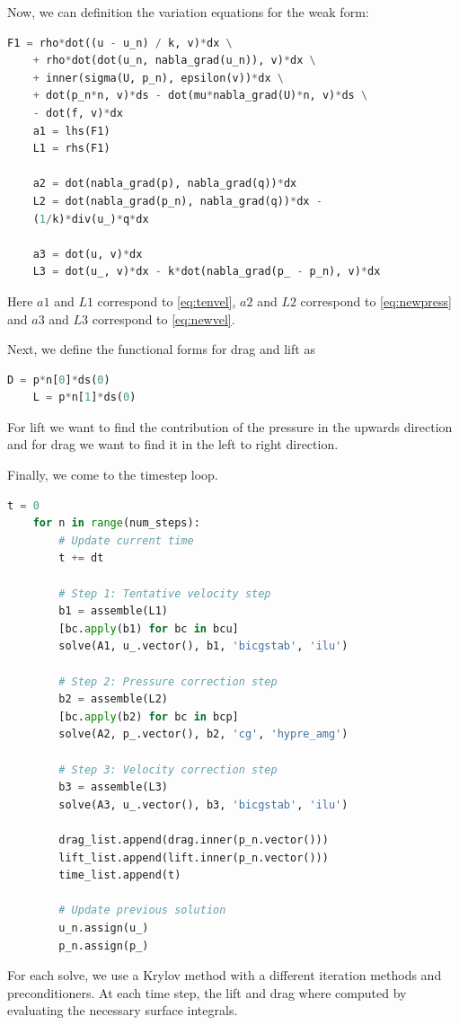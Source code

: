 \documentclass[12pt]{article}
\theoremstyle{definition}
\numberwithin{equation}{section}
\begin{document}
	Now, we can definition the variation equations for the weak form:
	\begin{lstlisting}[language=Python]
	F1 = rho*dot((u - u_n) / k, v)*dx \
	+ rho*dot(dot(u_n, nabla_grad(u_n)), v)*dx \
	+ inner(sigma(U, p_n), epsilon(v))*dx \
	+ dot(p_n*n, v)*ds - dot(mu*nabla_grad(U)*n, v)*ds \
	- dot(f, v)*dx
	a1 = lhs(F1)
	L1 = rhs(F1)
	
	a2 = dot(nabla_grad(p), nabla_grad(q))*dx
	L2 = dot(nabla_grad(p_n), nabla_grad(q))*dx -
	(1/k)*div(u_)*q*dx
	
	a3 = dot(u, v)*dx
	L3 = dot(u_, v)*dx - k*dot(nabla_grad(p_ - p_n), v)*dx
	\end{lstlisting}
	
	Here $a1$ and $L1$ correspond to \cref{eq:tenvel}, $a2$ and $L2$ correspond to \cref{eq:newpress} and $a3$ and $L3$ correspond to \cref{eq:newvel}.
	
	Next, we define the functional forms for drag and lift as
	\begin{lstlisting}[language=Python]
	D = p*n[0]*ds(0)
	L = p*n[1]*ds(0)
	\end{lstlisting}
	
	For lift we want to find the contribution of the pressure in the upwards direction and for drag we want to find it in the left to right direction. 
	
	Finally, we come to the timestep loop.
	\begin{lstlisting}[language=Python]
	t = 0
	for n in range(num_steps):
		# Update current time
		t += dt
		
		# Step 1: Tentative velocity step
		b1 = assemble(L1)
		[bc.apply(b1) for bc in bcu]
		solve(A1, u_.vector(), b1, 'bicgstab', 'ilu')
		
		# Step 2: Pressure correction step
		b2 = assemble(L2)
		[bc.apply(b2) for bc in bcp]
		solve(A2, p_.vector(), b2, 'cg', 'hypre_amg')
		
		# Step 3: Velocity correction step
		b3 = assemble(L3)
		solve(A3, u_.vector(), b3, 'bicgstab', 'ilu')
		
		drag_list.append(drag.inner(p_n.vector()))
		lift_list.append(lift.inner(p_n.vector()))
		time_list.append(t)
		
		# Update previous solution
		u_n.assign(u_)
		p_n.assign(p_)
	\end{lstlisting}
	
	For each solve, we use a Krylov method with a different iteration methods and preconditioners. At each time step, the lift and drag where computed by evaluating the necessary surface integrals.
\end{document}
